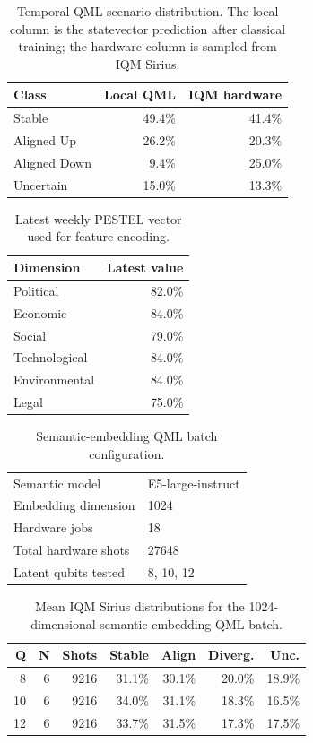 
\begin{table}[!htbp]
\centering
\scriptsize
\begin{tabular}{lrr}
\toprule
Class & Local QML & IQM hardware \\
\midrule
Stable & 49.4\% & 41.4\% \\
Aligned Up & 26.2\% & 20.3\% \\
Aligned Down & 9.4\% & 25.0\% \\
Uncertain & 15.0\% & 13.3\% \\
\bottomrule
\end{tabular}
\caption{Temporal QML scenario distribution. The local column is the statevector prediction after classical training; the hardware column is sampled from IQM Sirius.}
\label{tab:qml-results}
\end{table}

\begin{table}[!htbp]
\centering
\scriptsize
\begin{tabular}{lr}
\toprule
Dimension & Latest value \\
\midrule
Political & 82.0\% \\
Economic & 84.0\% \\
Social & 79.0\% \\
Technological & 84.0\% \\
Environmental & 84.0\% \\
Legal & 75.0\% \\
\bottomrule
\end{tabular}
\caption{Latest weekly PESTEL vector used for feature encoding.}
\label{tab:pestel-latest}
\end{table}

\begin{table}[!htbp]
\centering
\scriptsize
\begin{tabular}{lp{}}
\toprule
Semantic model & E5-large-instruct \\
Embedding dimension & 1024 \\
Hardware jobs & 18 \\
Total hardware shots & 27648 \\
Latent qubits tested & 8, 10, 12 \\
\bottomrule
\end{tabular}
\caption{Semantic-embedding QML batch configuration.}
\label{tab:semantic-config}
\end{table}

\begin{table}[!htbp]
\centering
\scriptsize
\begin{tabular}{rrrrrrr}
\toprule
Q & N & Shots & Stable & Align & Diverg. & Unc. \\
\midrule
8 & 6 & 9216 & 31.1\% & 30.1\% & 20.0\% & 18.9\% \\
10 & 6 & 9216 & 34.0\% & 31.1\% & 18.3\% & 16.5\% \\
12 & 6 & 9216 & 33.7\% & 31.5\% & 17.3\% & 17.5\% \\
\bottomrule
\end{tabular}
\caption{Mean IQM Sirius distributions for the 1024-dimensional semantic-embedding QML batch.}
\label{tab:semantic-batch}
\end{table}

